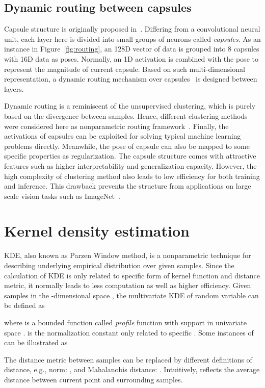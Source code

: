 \documentclass[runningheads]{llncs}
\begin{document}
\subsection{Dynamic routing between capsules}
Capsule structure is originally proposed in~\cite{hinton2011transforming}. Differing from a convolutional neural unit, each layer here is divided into small groups of neurons called \textit{capsules}. As an instance in Figure~\ref{fig:routing}, an 128D vector of data is grouped into 8 capsules with 16D data as poses. Normally, an 1D activation is combined with the pose to represent the magnitude of current capsule. Based on such multi-dimensional representation, a dynamic routing mechanism over capsules~\cite{sabour2017dynamic} is designed between layers. 

Dynamic routing is a reminiscent of the unsupervised clustering, which is purely based on the divergence between samples. Hence, different clustering methods were considered here as nonparametric routing framework~\cite{hinton2018emrouting}. Finally, the activations of capsules can be exploited for solving typical machine learning problems directly. Meanwhile, the pose of capsule can also be mapped to some specific properties as regularization. The capsule structure comes with attractive features such as higher interpretability and generalization capacity. However, the high complexity of clustering method also leads to low efficiency for both training and inference. This drawback prevents the structure from applications on large scale vision tasks such as ImageNet~\cite{ILSVRC15}. 

\section{Kernel density estimation}

KDE, also known as Parzen Window method, is a nonparametric technique for describing underlying empirical distribution over given samples. Since the calculation of KDE is only related to specific form of kernel function and distance metric, it normally leads to less computation as well as higher efficiency. Given  samples  in the -dimensional space , the multivariate KDE of random variable  can be defined as

where  is a bounded function called \textit{profile} function with support in univariate space .  is the normalization constant only related to specific . Some instances of  can be illustrated as~\cite{wand1994kernel}

The distance metric between samples  can be replaced by different definitions of distance, e.g.,  norm: , and Mahalanobis distance: . Intuitively,  reflects the average distance between current point  and surrounding samples.
\end{document}
